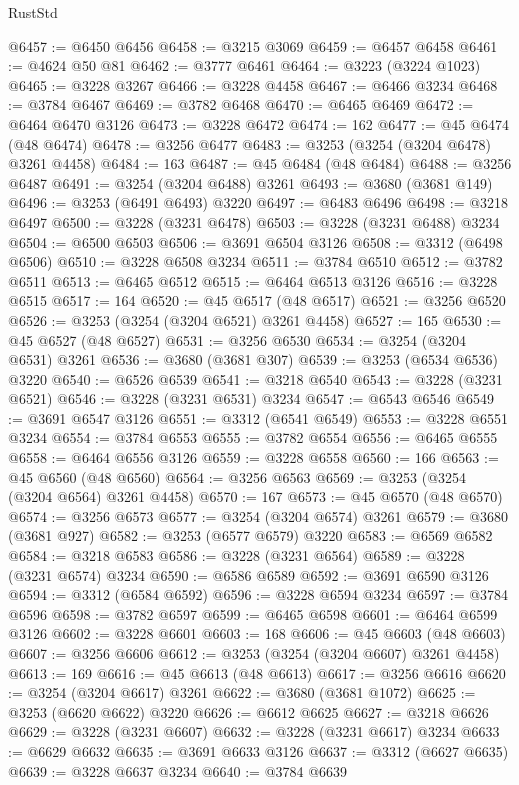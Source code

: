 \begin{lexlean}{RustStd}
\begin{coremodule}
{\begin{coremodule}
{{{{{{{{{{{{{{{{{{{{{{{{{{{{{{{{{{{{{@6457 := @6450 @6456
@6458 := @3215 @3069
@6459 := @6457 @6458
@6461 := @4624 @50 @81
@6462 := @3777 @6461
@6464 := @3223 (@3224 @1023)
@6465 := @3228 @3267
@6466 := @3228 @4458
@6467 := @6466 @3234
@6468 := @3784 @6467
@6469 := @3782 @6468
@6470 := @6465 @6469
@6472 := @6464 @6470 @3126
@6473 := @3228 @6472
@6474 := 162
@6477 := @45 @6474 (@48 @6474)
@6478 := @3256 @6477
@6483 := @3253 (@3254 (@3204 @6478) @3261 @4458)
@6484 := 163
@6487 := @45 @6484 (@48 @6484)
@6488 := @3256 @6487
@6491 := @3254 (@3204 @6488) @3261
@6493 := @3680 (@3681 @149)
@6496 := @3253 (@6491 @6493) @3220
@6497 := @6483 @6496
@6498 := @3218 @6497
@6500 := @3228 (@3231 @6478)
@6503 := @3228 (@3231 @6488) @3234
@6504 := @6500 @6503
@6506 := @3691 @6504 @3126
@6508 := @3312 (@6498 @6506)
@6510 := @3228 @6508 @3234
@6511 := @3784 @6510
@6512 := @3782 @6511
@6513 := @6465 @6512
@6515 := @6464 @6513 @3126
@6516 := @3228 @6515
@6517 := 164
@6520 := @45 @6517 (@48 @6517)
@6521 := @3256 @6520
@6526 := @3253 (@3254 (@3204 @6521) @3261 @4458)
@6527 := 165
@6530 := @45 @6527 (@48 @6527)
@6531 := @3256 @6530
@6534 := @3254 (@3204 @6531) @3261
@6536 := @3680 (@3681 @307)
@6539 := @3253 (@6534 @6536) @3220
@6540 := @6526 @6539
@6541 := @3218 @6540
@6543 := @3228 (@3231 @6521)
@6546 := @3228 (@3231 @6531) @3234
@6547 := @6543 @6546
@6549 := @3691 @6547 @3126
@6551 := @3312 (@6541 @6549)
@6553 := @3228 @6551 @3234
@6554 := @3784 @6553
@6555 := @3782 @6554
@6556 := @6465 @6555
@6558 := @6464 @6556 @3126
@6559 := @3228 @6558
@6560 := 166
@6563 := @45 @6560 (@48 @6560)
@6564 := @3256 @6563
@6569 := @3253 (@3254 (@3204 @6564) @3261 @4458)
@6570 := 167
@6573 := @45 @6570 (@48 @6570)
@6574 := @3256 @6573
@6577 := @3254 (@3204 @6574) @3261
@6579 := @3680 (@3681 @927)
@6582 := @3253 (@6577 @6579) @3220
@6583 := @6569 @6582
@6584 := @3218 @6583
@6586 := @3228 (@3231 @6564)
@6589 := @3228 (@3231 @6574) @3234
@6590 := @6586 @6589
@6592 := @3691 @6590 @3126
@6594 := @3312 (@6584 @6592)
@6596 := @3228 @6594 @3234
@6597 := @3784 @6596
@6598 := @3782 @6597
@6599 := @6465 @6598
@6601 := @6464 @6599 @3126
@6602 := @3228 @6601
@6603 := 168
@6606 := @45 @6603 (@48 @6603)
@6607 := @3256 @6606
@6612 := @3253 (@3254 (@3204 @6607) @3261 @4458)
@6613 := 169
@6616 := @45 @6613 (@48 @6613)
@6617 := @3256 @6616
@6620 := @3254 (@3204 @6617) @3261
@6622 := @3680 (@3681 @1072)
@6625 := @3253 (@6620 @6622) @3220
@6626 := @6612 @6625
@6627 := @3218 @6626
@6629 := @3228 (@3231 @6607)
@6632 := @3228 (@3231 @6617) @3234
@6633 := @6629 @6632
@6635 := @3691 @6633 @3126
@6637 := @3312 (@6627 @6635)
@6639 := @3228 @6637 @3234
@6640 := @3784 @6639
}}}}}}}}}}}}}}}}}}}}}}}}}}}}}}}}}}}}}
\end{coremodule}}
\end{coremodule}
\end{lexlean}
